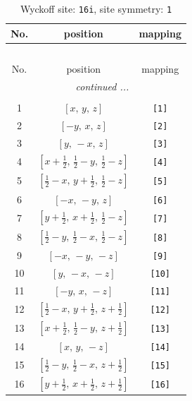 \documentclass[fleqn,8pt]{jsarticle}
\begin{document}
\begin{longtable}{ccc}
\caption{Wyckoff site: {\tt 16i}, site symmetry: {\tt 1}}
 \\
 \hline \hline
No. & position & mapping \\ \hline \endfirsthead

\multicolumn{2}{l}{\tablename\ \thetable{}} \\
 \hline \hline
No. & position & mapping \\ \hline \endhead

 \hline \hline
\multicolumn{2}{r}{\footnotesize\it continued ...} \\ \endfoot

 \hline \hline
\multicolumn{2}{r}{} \\ \endlastfoot

1 & $\left[ x,\, y,\, z \right]$ & {\tt [1]} \\ \hline
2 & $\left[ - y,\, x,\, z \right]$ & {\tt [2]} \\ \hline
3 & $\left[ y,\, - x,\, z \right]$ & {\tt [3]} \\ \hline
4 & $\left[ x + \frac{1}{2},\, \frac{1}{2} - y,\, \frac{1}{2} - z \right]$ & {\tt [4]} \\ \hline
5 & $\left[ \frac{1}{2} - x,\, y + \frac{1}{2},\, \frac{1}{2} - z \right]$ & {\tt [5]} \\ \hline
6 & $\left[ - x,\, - y,\, z \right]$ & {\tt [6]} \\ \hline
7 & $\left[ y + \frac{1}{2},\, x + \frac{1}{2},\, \frac{1}{2} - z \right]$ & {\tt [7]} \\ \hline
8 & $\left[ \frac{1}{2} - y,\, \frac{1}{2} - x,\, \frac{1}{2} - z \right]$ & {\tt [8]} \\ \hline
9 & $\left[ - x,\, - y,\, - z \right]$ & {\tt [9]} \\ \hline
10 & $\left[ y,\, - x,\, - z \right]$ & {\tt [10]} \\ \hline
11 & $\left[ - y,\, x,\, - z \right]$ & {\tt [11]} \\ \hline
12 & $\left[ \frac{1}{2} - x,\, y + \frac{1}{2},\, z + \frac{1}{2} \right]$ & {\tt [12]} \\ \hline
13 & $\left[ x + \frac{1}{2},\, \frac{1}{2} - y,\, z + \frac{1}{2} \right]$ & {\tt [13]} \\ \hline
14 & $\left[ x,\, y,\, - z \right]$ & {\tt [14]} \\ \hline
15 & $\left[ \frac{1}{2} - y,\, \frac{1}{2} - x,\, z + \frac{1}{2} \right]$ & {\tt [15]} \\ \hline
16 & $\left[ y + \frac{1}{2},\, x + \frac{1}{2},\, z + \frac{1}{2} \right]$ & {\tt [16]} \\
\end{longtable}
\end{document}
